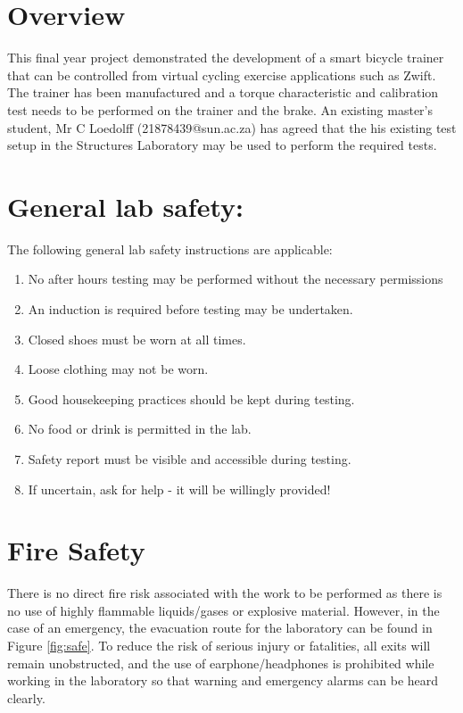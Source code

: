 \newpage
\appendix
\renewcommand\thechapter{C}


\section*{Overview}

This final year project demonstrated the development of a smart bicycle trainer that can be controlled from virtual cycling exercise applications such as Zwift. The trainer has been manufactured and a torque characteristic and calibration test needs to be performed on the trainer and the brake. An existing master's student, Mr C Loedolff (21878439@sun.ac.za) has agreed that the his existing test setup in the Structures Laboratory may be used to perform the required tests.

\section*{General lab safety:}
The following general lab safety instructions are applicable:
\begin{enumerate}
	\item No after hours testing may be performed without the necessary permissions
	\item An induction is required before testing may be undertaken.
	\item Closed shoes must be worn at all times.
	\item Loose clothing may not be worn.
	\item Good housekeeping practices should be kept during testing.
	\item No food or drink is permitted in the lab.
	\item Safety report must be visible and accessible during testing.
	\item If uncertain, ask for help - it will be willingly provided!
\end{enumerate}

\section*{Fire Safety}

There is no direct fire risk associated with the work to be performed as there is no use of highly flammable liquids/gases or explosive material. However, in the case of an emergency, the evacuation route for the laboratory can be found in Figure \ref{fig:safe}.  To reduce the risk of serious injury or fatalities, all exits will remain unobstructed, and the use of earphone/headphones is prohibited while working in the laboratory so that warning and emergency alarms can be heard clearly.

